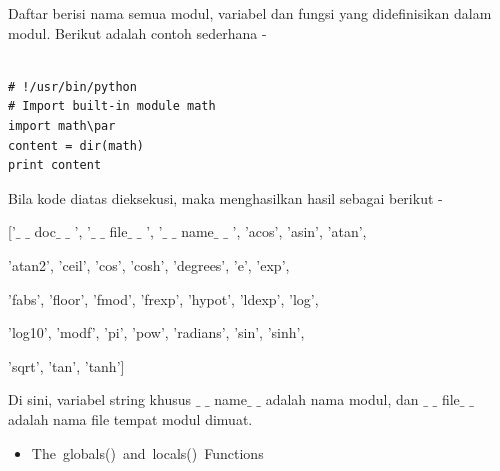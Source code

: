 \noindent Daftar berisi nama semua modul, variabel dan fungsi yang didefinisikan dalam modul. Berikut adalah contoh sederhana -\par
\vspace{\baselineskip}

\begin{verbatim}

# !/usr/bin/python
# Import built-in module math
import math\par
content = dir(math)
print content

\end{verbatim}

\vspace{\baselineskip}
\noindent Bila kode diatas dieksekusi, maka menghasilkan hasil sebagai berikut -\par

\vspace{\baselineskip}
\noindent \hspace*{0.5in}['$ \_ $ $ \_ $ doc$ \_ $ $ \_ $ ', '$ \_ $ $ \_ $ file$ \_ $ $ \_ $ ', '$ \_ $ $ \_ $ name$ \_ $ $ \_ $ ', 'acos', 'asin', 'atan', \par


\noindent \hspace*{0.5in}'atan2', 'ceil', 'cos', 'cosh', 'degrees', 'e', 'exp', \par


\noindent \hspace*{0.5in}'fabs', 'floor', 'fmod', 'frexp', 'hypot', 'ldexp', 'log',\par


\noindent \hspace*{0.5in}'log10', 'modf', 'pi', 'pow', 'radians', 'sin', 'sinh', \par


\noindent \hspace*{0.5in}'sqrt', 'tan', 'tanh']\par

\vspace{\baselineskip}
\noindent Di sini, variabel string khusus $ \_ $ $ \_ $ name$ \_ $ $ \_ $  adalah nama modul, dan $ \_ $ $ \_ $ file$ \_ $ $ \_ $  adalah nama file tempat modul dimuat.\par


\vspace{\baselineskip}
\begin{itemize}
	\item The globals() and locals() Functions 
\end{itemize}

